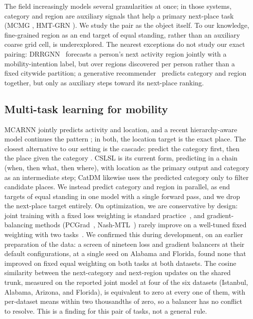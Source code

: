 The field
increasingly models several granularities at once; in those systems, category and
region are auxiliary signals that help a primary next-place task
(MCMG \cite{sun2024mcmg}, HMT-GRN \cite{lim2022hmtgrn}).
We study the pair as the object itself. To our knowledge, fine-grained region as an
end target of equal standing, rather than an auxiliary coarse grid cell, is
underexplored.
The nearest exceptions do not study our exact pairing:
DRRGNN~\cite{zhu2022drrgnn} forecasts a person's next activity region jointly
with a mobility-intention label, but over regions discovered per person rather
than a fixed citywide partition; a generative recommender~\cite{sun2025kgtb}
predicts category and region together, but only as auxiliary steps toward its
next-place ranking.

\subsection{Multi-task learning for mobility}
\label{sec:related-mtl}
MCARNN \cite{Liao2018} jointly predicts activity and
location, and a recent hierarchy-aware model continues the
pattern \cite{wang2025hamtl}; in both, the location target is
the exact place. The closest alternative to our setting is
the cascade: predict the category first, then the place given the
category \cite{ye2013nextmove}. CSLSL
\cite{huang2024cslsl} is its current form, predicting in a chain (when, then what,
then where), with location as the primary output and category as an
intermediate step; CatDM \cite{yu2020catdm} likewise uses the predicted
category only to filter candidate places. We instead predict
category and region in parallel, as end targets of equal standing in one model
with a single forward pass, and we drop the next-place target entirely. On optimization, we are conservative by design: joint training with a fixed loss weighting is
standard practice~\cite{caruana1997multitask}, and gradient-balancing methods (PCGrad~\cite{yu2020pcgrad}, Nash-MTL~\cite{navon2022nashmtl})
rarely improve on a well-tuned fixed weighting with two tasks~\cite{xin2022domtl}. We confirmed
this during development, on an earlier preparation of the data: a screen of nineteen loss and
gradient balancers at their default configurations, at a single seed on Alabama and Florida, found
none that improved on fixed equal weighting on both tasks at both datasets.  The cosine similarity between the next-category and next-region updates on the
shared trunk, measured on the reported joint model at four of the six datasets (Istanbul, Alabama,
Arizona, and Florida), is equivalent to zero at every one of them, with per-dataset means within
two thousandths of zero, so a balancer has no conflict to resolve. This is a finding for this pair
of tasks, not a general rule.


